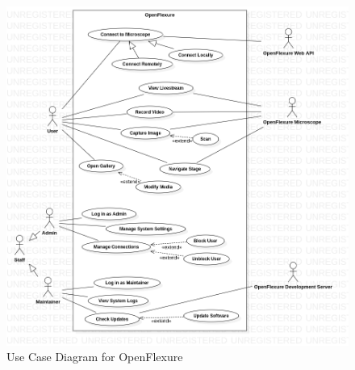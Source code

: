 \begin{figure}[H]
	\centering
	\includegraphics[scale=0.5]{Uml_Images/use_case_diagram}
	\caption{Use Case Diagram for OpenFlexure}
	\label{fig:use_case_diagram}
\end{figure}


